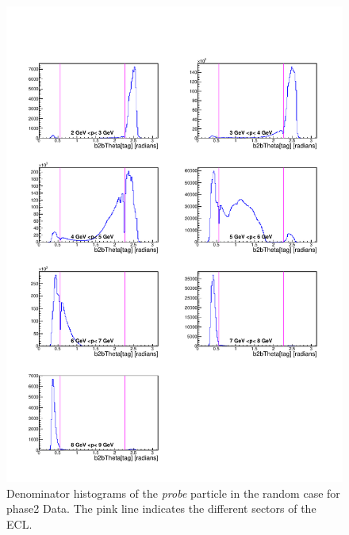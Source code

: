 \documentclass[a4paper,11pt,twosided,final,german,openbib,pdftex,listof=totoc,bibliography=totoc]{scrbook}
\begin{document}
\begin{appendix}
\begin{figure}[!htbp]
	\centering
	\includegraphics[width=\textwidth]{Plots/master/xPMThetaRandomD_Data}
	\caption[Momentum $\phi$ Random Denominator Histogram Phase2 Data]{Denominator histograms of the \textit{probe} particle in the random case for phase2 Data. The pink line indicates the different sectors of the ECL.}
	\label{plt:PMThetaRandomD_Data}
\end{figure}



\end{appendix}
\end{document}
